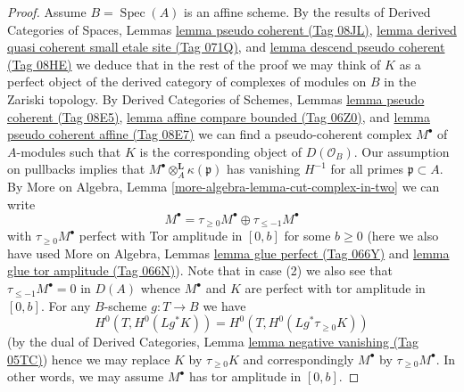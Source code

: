 \documentclass{amsart}
\theoremstyle{plain}
\theoremstyle{definition}
\theoremstyle{remark}
\numberwithin{equation}{subsection}
\def\Spec{\mathop{\mathrm{Spec}}}
\begin{document}
\begin{proof}
\medskip\noindent
Assume $B = \Spec(A)$ is an affine scheme. By the results of
Derived Categories of Spaces, Lemmas
\href{https://stacks.math.columbia.edu/tag/08JL}{lemma pseudo coherent (Tag 08JL)},
\href{https://stacks.math.columbia.edu/tag/071Q}{lemma derived quasi coherent small etale site (Tag 071Q)}, and
\href{https://stacks.math.columbia.edu/tag/08HE}{lemma descend pseudo coherent (Tag 08HE)}
we deduce that in the rest of the proof we may think of $K$ as a perfect
object of the derived category of complexes of modules on $B$
in the Zariski topology. By 
Derived Categories of Schemes, Lemmas
\href{https://stacks.math.columbia.edu/tag/08E5}{lemma pseudo coherent (Tag 08E5)},
\href{https://stacks.math.columbia.edu/tag/06Z0}{lemma affine compare bounded (Tag 06Z0)}, and
\href{https://stacks.math.columbia.edu/tag/08E7}{lemma pseudo coherent affine (Tag 08E7)} we can find a pseudo-coherent
complex $M^\bullet$ of $A$-modules such that $K$ is the corresponding
object of $D(\mathcal{O}_B)$. Our assumption on pullbacks implies
that $M^\bullet \otimes^\mathbf{L}_A \kappa(\mathfrak p)$
has vanishing $H^{-1}$ for all primes $\mathfrak p \subset A$.
By More on Algebra, Lemma \ref{more-algebra-lemma-cut-complex-in-two}
we can write
$$
M^\bullet =
\tau_{\geq 0}M^\bullet \oplus \tau_{\leq - 1}M^\bullet
$$
with $\tau_{\geq 0}M^\bullet$ perfect with Tor amplitude in $[0, b]$
for some $b \geq 0$ (here we also have used
More on Algebra, Lemmas \href{https://stacks.math.columbia.edu/tag/066Y}{lemma glue perfect (Tag 066Y)} and
\href{https://stacks.math.columbia.edu/tag/066N}{lemma glue tor amplitude (Tag 066N)}).
Note that in case (2) we also see that $\tau_{\leq - 1}M^\bullet = 0$
in $D(A)$ whence $M^\bullet$ and $K$ are perfect with
tor amplitude in $[0, b]$. For any $B$-scheme $g : T \to B$ we have
$$
H^0(T, H^0(Lg^*K)) = H^0(T, H^0(Lg^*\tau_{\geq 0}K))
$$
(by the dual of Derived Categories, Lemma
\href{https://stacks.math.columbia.edu/tag/05TC}{lemma negative vanishing (Tag 05TC)})
hence we may replace $K$ by $\tau_{\geq 0}K$ and correspondingly
$M^\bullet$ by $\tau_{\geq 0}M^\bullet$. In other words, we may
assume $M^\bullet$ has tor amplitude in $[0, b]$.


\end{proof}
\end{document}
